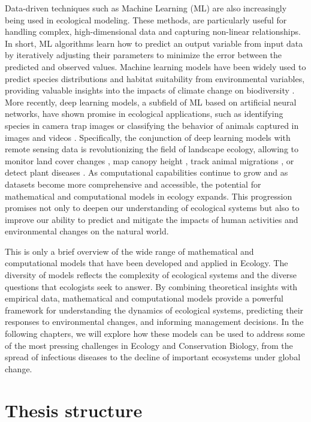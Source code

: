 Data-driven techniques such as Machine Learning (ML) are also increasingly
being used in ecological modeling. These methods, are particularly useful for
handling complex, high-dimensional data and capturing non-linear relationships.
In short, ML algorithms learn how to predict an output variable from input data
by iteratively adjusting their parameters to minimize the error between the
predicted and observed values. Machine learning models have been widely used to
predict species distributions and habitat suitability from environmental
variables, providing valuable insights into the impacts of climate change on
biodiversity \cite{Christin2019}. More recently, deep learning models, a
subfield of ML based on artificial neural networks, have shown promise in
ecological applications, such as identifying species in camera trap images
\cite{Tabak2019} or classifying the behavior of animals captured in images and
videos \cite{Christin2019}. Specifically, the conjunction of deep learning
models with remote sensing data is revolutionizing the field of landscape
ecology, allowing to monitor land cover changes \cite{Kussul2017}, map canopy
height \cite{Lang2023}, track animal migrations \cite{Wu2023}, or detect plant
diseases \cite{Zarco-Tejada2021}. As computational capabilities continue to
grow and as datasets become more comprehensive and accessible, the potential
for mathematical and computational models in ecology expands. This progression
promises not only to deepen our understanding of ecological systems but also to
improve our ability to predict and mitigate the impacts of human activities and
environmental changes on the natural world.

This is only a brief overview of the wide range of mathematical and
computational models that have been developed and applied in Ecology. The
diversity of models reflects the complexity of ecological systems and the
diverse questions that ecologists seek to answer. By combining theoretical
insights with empirical data, mathematical and computational models provide a
powerful framework for understanding the dynamics of ecological systems,
predicting their responses to environmental changes, and informing management
decisions. In the following chapters, we will explore how these models can be
used to address some of the most pressing challenges in Ecology and
Conservation Biology, from the spread of infectious diseases to the decline of
important ecosystems under global change.

\section{\label{sec:Thesis structure} Thesis structure}

